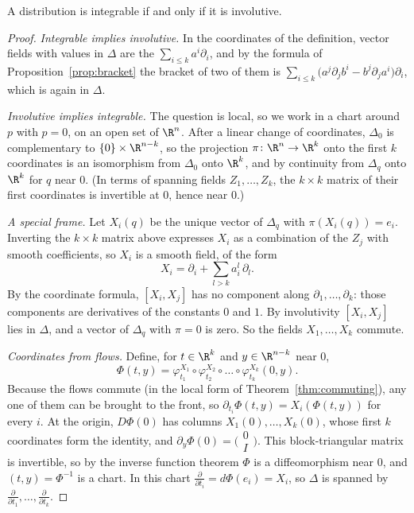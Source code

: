 \begin{theorem}[Frobenius]\label{thm:frobenius}
A distribution is integrable if and only if it is involutive.
\end{theorem}
\begin{proof}
\emph{Integrable implies involutive.} In the coordinates of the definition, vector fields with values in $\Delta$ are the $\sum_{i\le k}a^i\partial_i$, and by the
formula of Proposition~\ref{prop:bracket} the bracket of two of them is $\sum_{i\le k}\bigl(a^j\partial_jb^i-b^j\partial_ja^i\bigr)\partial_i$, which is again in $\Delta$.

\emph{Involutive implies integrable.} The question is local, so we work in a chart around $p$ with $p=0$, on an open set of $\R^n$. After a linear change
of coordinates, $\Delta_0$ is complementary to $\{0\}\times\R^{n-k}$, so the projection $\pi\colon\R^n\to\R^k$ onto the first $k$ coordinates is an isomorphism
from $\Delta_0$ onto $\R^k$, and by continuity from $\Delta_q$ onto $\R^k$ for $q$ near $0$. (In terms of spanning fields $Z_1,\dots,Z_k$, the $k\times k$ matrix
of their first coordinates is invertible at $0$, hence near $0$.)

\emph{A special frame.} Let $X_i(q)$ be the unique vector of $\Delta_q$ with $\pi(X_i(q))=e_i$. Inverting the $k\times k$ matrix above expresses $X_i$ as a
combination of the $Z_j$ with smooth coefficients, so $X_i$ is a smooth field, of the form
\[
X_i=\partial_i+\sum_{l>k}a_i^l\,\partial_l.
\]
By the coordinate formula, $[X_i,X_j]$ has no component along $\partial_1,\dots,\partial_k$: those components are derivatives of the constants $0$ and $1$. By
involutivity $[X_i,X_j]$ lies in $\Delta$, and a vector of $\Delta_q$ with $\pi=0$ is zero. So the fields $X_1,\dots,X_k$ commute.

\emph{Coordinates from flows.} Define, for $t\in\R^k$ and $y\in\R^{n-k}$ near $0$,
\[
\Phi(t,y)=\varphi^{X_1}_{t_1}\circ\varphi^{X_2}_{t_2}\circ\dots\circ\varphi^{X_k}_{t_k}(0,y).
\]
Because the flows commute (in the local form of Theorem~\ref{thm:commuting}), any one of them can be brought to the front, so
$\partial_{t_i}\Phi(t,y)=X_i(\Phi(t,y))$ for every $i$. At the origin, $D\Phi(0)$ has columns $X_1(0),\dots,X_k(0)$, whose first $k$ coordinates form the
identity, and $\partial_y\Phi(0)=\bigl(\begin{smallmatrix}0\\ I\end{smallmatrix}\bigr)$. This block-triangular matrix is invertible, so by the inverse function
theorem $\Phi$ is a diffeomorphism near $0$, and $(t,y)=\Phi^{-1}$ is a chart. In this chart $\frac\partial{\partial t_i}=d\Phi(e_i)=X_i$, so $\Delta$ is spanned by
$\frac\partial{\partial t_1},\dots,\frac\partial{\partial t_k}$.
\end{proof}

